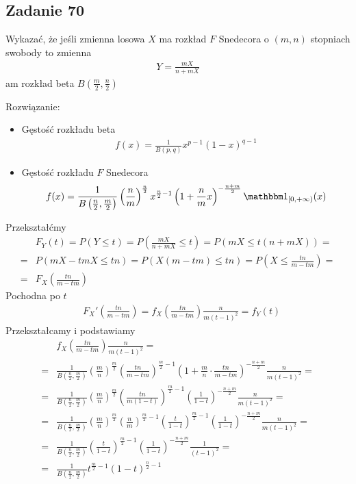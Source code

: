 \subsection*{Zadanie 70}
Wykazać, że jeśli zmienna losowa $ X $ ma rozkład $ F $ Snedecora o $ (m,n) $ stopniach swobody to zmienna
\begin{gather*}
Y=\frac{mX}{n+mX}
\end{gather*}
am rozkład beta $ B \left(\frac{m}{2},\frac{n}{2}\right) $

Rozwiązanie:
\begin{itemize}
\item Gęstość rozkładu beta
\begin{gather*}
f(x)=\frac{1}{B (p,q)}x^{p-1}(1-x)^{q-1}
\end{gather*}
\item Gęstość rozkładu $ F $ Snedecora
\begin{gather*}
f(x)=\frac{1}{B \left(\frac{n}{2},\frac{m}{2}\right)}\left(\frac{n}{m}\right)^\frac{n}{2}x^{\frac{n}{2}-1}\left(1+\frac{n}{m}x\right)^{-\frac{n+m}{2}}\mathbbm1_{[0,+\infty )}(x)
\end{gather*}
\end{itemize}
Przekształćmy
\begin{align*}
&F_Y(t)=
P\left(Y\le t\right)=
P\left(\frac{mX}{n+mX}\le t\right)=
P\left(mX\le t(n+mX)\right)
=\\=&
P\left(mX-tmX\le tn\right)=
P\left(X(m-tm)\le tn\right)=
P\left(X\le \frac{tn}{m-tm}\right)
=\\=&
F_X(\frac{tn}{m-tm})
\end{align*}
Pochodna po $ t $
\begin{align*}
&F_X'\left(\frac{tn}{m-tm}\right)=
f_X\left(\frac{tn}{m-tm}\right)\frac{n}{m (t-1)^2}=f_Y(t)
\end{align*}
Przekształcamy i podstawiamy
\begin{align*}
&f_X\left(\frac{tn}{m-tm}\right)\frac{n}{m (t-1)^2}
=\\=&
\frac{1}{B \left(\frac{n}{2},\frac{m}{2}\right)}
\left(\frac{m}{n}\right)^\frac{m}{2}
\left(\frac{tn}{m-tm}\right)^{\frac{m}{2}-1}
\left(1+\frac{m}{n}\cdot \frac{tn}{m-tm}\right)^{-\frac{n+m}{2}}
\frac{n}{m (t-1)^2}
=\\=&
\frac{1}{B \left(\frac{n}{2},\frac{m}{2}\right)}
\left(\frac{m}{n}\right)^\frac{m}{2}
\left(\frac{tn}{m(1-t)}\right)^{\frac{m}{2}-1}
\left(\frac{1}{1-t}\right)^{-\frac{n+m}{2}}
\frac{n}{m (t-1)^2}
=\\=&
\frac{1}{B \left(\frac{n}{2},\frac{m}{2}\right)}
\left(\frac{m}{n}\right)^\frac{m}{2}
\left(\frac{n}{m}\right)^{\frac{m}{2}-1}
\left(\frac{t}{1-t}\right)^{\frac{m}{2}-1}
\left(\frac{1}{1-t}\right)^{-\frac{n+m}{2}}
\frac{n}{m (t-1)^2}
=\\=&
\frac{1}{B \left(\frac{n}{2},\frac{m}{2}\right)}
\left(\frac{t}{1-t}\right)^{\frac{m}{2}-1}
\left(\frac{1}{1-t}\right)^{-\frac{n+m}{2}}
\frac{1}{(t-1)^2}
=\\=&
\frac{1}{B \left(\frac{n}{2},\frac{m}{2}\right)}
t^{\frac{m}{2}-1}
\left(1-t\right)^{\frac{n}{2}-1}
\end{align*}

